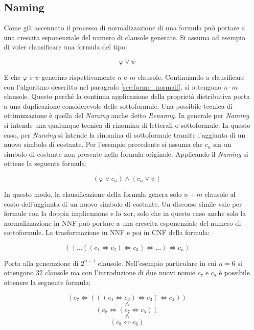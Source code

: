 \documentclass[./main.tex]{subfiles}
\begin{document}

\subsection{Naming}
Come già accennato il processo di normalizzazione di una formula può portare a una crescita esponenziale del numero di clausole generate.
Si assuma ad esempio di voler clausificare una formula del tipo:

$$ \varphi \lor \psi$$

E che $\varphi$ e $\psi$ generino rispettivamente $n$ e $m$ clausole. Continuando a clausificare con l'algoritmo 
descritto nel paragrafo \ref{sec:forme_normali}, si ottengono $n \cdot m$ clausole. 
Questo perché la continua applicazione della proprietà distributiva porta a una duplicazione considerevole delle sottoformule.
Una possibile tecnica di ottimizzazione è quella del \textit{Naming} anche detto \textit{Renamig}.
In generale per \textit{Naming} si intende una qualunque tecnica di rinomina di letterali o sottoformule.
In questo caso, per \textit{Naming} si intende la rinomina di sottoformule tramite l'aggiunta di un nuovo simbolo di costante.
Per l'esempio precedente si assuma che $c_n$ sia un simbolo di costante non presente nella formula originale.
Applicando il \textit{Naming} si ottiene la seguente formula:

$$ (\varphi \lor c_n) \land (c_n \lor \psi)$$

In questo modo, la clausificazione della formula genera solo $n + m$ clausole al costo dell'aggiunta di un nuovo simbolo di costante.
Un discorso simile vale per formule con la doppia implicazione e lo xor, solo che in questo caso
anche solo la normalizzazione in NNF può portare a una crescita esponenziale del numero di sottoformule.
La trasformazione in NNF e poi in CNF della formula:

$$ ((...((c_1 \Leftrightarrow c_2) \Leftrightarrow c_3) \Leftrightarrow ...) \Leftrightarrow c_n)$$

Porta alla generazione di $2^{n-1}$ clausole. Nell'esempio particolare in cui $n=6$ si ottengono $32$ clausole ma con l'introduzione 
di due nuovi nomie $c_7$ e $c_8$ è possibile ottenere la seguente formula:

$$ (c_7 \Leftrightarrow (((c_1 \Leftrightarrow c_2) \Leftrightarrow c_3) \Leftrightarrow c_4)) $$
$$ \land $$
$$ (c_8 \Leftrightarrow (c_7 \Leftrightarrow c_5)) $$
$$ \land $$
$$ (c_8 \Leftrightarrow c_6) $$
\end{document}
